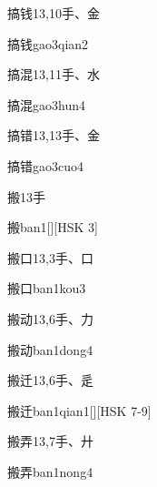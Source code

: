 \begin{Entry}{搞钱}{13,10}{⼿、⾦}
  \begin{Phonetics}{搞钱}{gao3qian2}
  \end{Phonetics}
\end{Entry}

\begin{Entry}{搞混}{13,11}{⼿、⽔}
  \begin{Phonetics}{搞混}{gao3hun4}
  \end{Phonetics}
\end{Entry}

\begin{Entry}{搞错}{13,13}{⼿、⾦}
  \begin{Phonetics}{搞错}{gao3cuo4}
  \end{Phonetics}
\end{Entry}

\begin{Entry}{搬}{13}{⼿}
  \begin{Phonetics}{搬}{ban1}[][HSK 3]
  \end{Phonetics}
\end{Entry}

\begin{Entry}{搬口}{13,3}{⼿、⼝}
  \begin{Phonetics}{搬口}{ban1kou3}
  \end{Phonetics}
\end{Entry}

\begin{Entry}{搬动}{13,6}{⼿、⼒}
  \begin{Phonetics}{搬动}{ban1dong4}
  \end{Phonetics}
\end{Entry}

\begin{Entry}{搬迁}{13,6}{⼿、⾡}
  \begin{Phonetics}{搬迁}{ban1qian1}[][HSK 7-9]
  \end{Phonetics}
\end{Entry}

\begin{Entry}{搬弄}{13,7}{⼿、⼶}
  \begin{Phonetics}{搬弄}{ban1nong4}
  \end{Phonetics}
\end{Entry}

